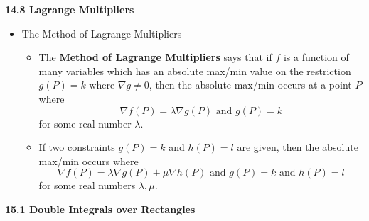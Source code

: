 \begin{itemize}
  
  
\end{itemize}
  
  \newpage
  
  \centerline{\bf 14.8 Lagrange Multipliers}
  
  \begin{itemize}
  
  \item The Method of Lagrange Multipliers
  
    \begin{itemize}
    \item 
      The \textbf{Method of Lagrange Multipliers} says that if $f$ is a function of many variables which has an absolute max/min value on the restriction $g(P)=k$ where $\nabla g \not= 0$, then the absolute max/min occurs at a point $P$ where 
      \[
        \nabla f(P)=\lambda \nabla g(P) \text{ and } g(P)=k
      \] 
      for some real number $\lambda$.

    \item 
      If two constraints $g(P)=k$ and $h(P)=l$ are given, then the absolute max/min occurs where
      \[
        \nabla f(P)=\lambda \nabla g(P) + \mu \nabla h(P) \text{ and } g(P)=k \text{ and } h(P)=l
      \]
      for some real numbers $\lambda,\mu$.

    \end{itemize}
    
  
    
  \end{itemize}
  
  \newpage
  
\centerline{\bf 15.1 Double Integrals over Rectangles}
  
